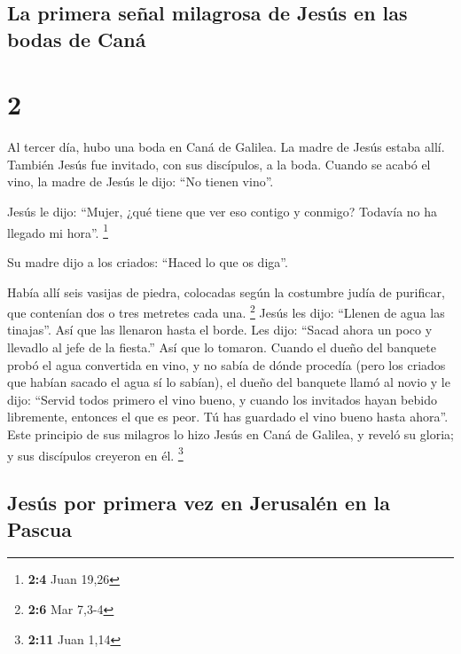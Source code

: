 \hypertarget{la-primera-seuxf1al-milagrosa-de-jesuxfas-en-las-bodas-de-canuxe1}{%
\subsection{La primera señal milagrosa de Jesús en las bodas de
Caná}\label{la-primera-seuxf1al-milagrosa-de-jesuxfas-en-las-bodas-de-canuxe1}}

\hypertarget{section-1}{%
\section{2}\label{section-1}}

 Al tercer día, hubo una boda en Caná de Galilea. La madre
de Jesús estaba allí.  También Jesús fue invitado, con sus
discípulos, a la boda.  Cuando se acabó el vino, la madre
de Jesús le dijo: ``No tienen vino''.

 Jesús le dijo: ``Mujer, ¿qué tiene que ver eso contigo y
conmigo? Todavía no ha llegado mi hora''. \footnote{\textbf{2:4} Juan
  19,26}

 Su madre dijo a los criados: ``Haced lo que os diga''.

 Había allí seis vasijas de piedra, colocadas según la
costumbre judía de purificar, que contenían dos o tres metretes cada
una. \footnote{\textbf{2:6} Mar 7,3-4}  Jesús les dijo:
``Llenen de agua las tinajas''. Así que las llenaron hasta el borde.
 Les dijo: ``Sacad ahora un poco y llevadlo al jefe de la
fiesta.'' Así que lo tomaron.  Cuando el dueño del
banquete probó el agua convertida en vino, y no sabía de dónde procedía
(pero los criados que habían sacado el agua sí lo sabían), el dueño del
banquete llamó al novio  y le dijo: ``Servid todos
primero el vino bueno, y cuando los invitados hayan bebido libremente,
entonces el que es peor. Tú has guardado el vino bueno hasta ahora''.
 Este principio de sus milagros lo hizo Jesús en Caná de
Galilea, y reveló su gloria; y sus discípulos creyeron en él.
\footnote{\textbf{2:11} Juan 1,14}

\hypertarget{jesuxfas-por-primera-vez-en-jerusaluxe9n-en-la-pascua}{%
\subsection{Jesús por primera vez en Jerusalén en la
Pascua}\label{jesuxfas-por-primera-vez-en-jerusaluxe9n-en-la-pascua}}

